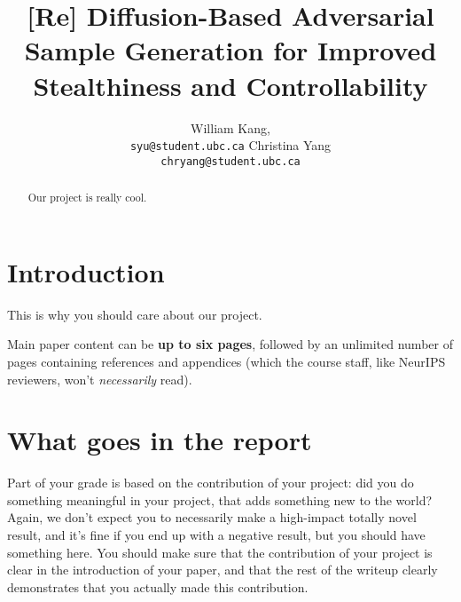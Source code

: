 \documentclass{article}
\title{[Re] Diffusion-Based Adversarial Sample Generation for Improved Stealthiness and Controllability}
\author{%
  William Kang,
  \\
  \texttt{syu@student.ubc.ca}
  \And
  Christina Yang\\
  \texttt{chryang@student.ubc.ca}
}
\begin{document}
\maketitle


\begin{abstract}
    Our project is really cool.
\end{abstract}


\section{Introduction}

This is why you should care about our project.

Main paper content can be \textbf{up to six pages},
followed by an unlimited number of pages containing references and appendices
(which the course staff, like NeurIPS reviewers, won't \emph{necessarily} read).

\section{What goes in the report}
Part of your grade is based on the contribution of your project:
did you do something meaningful in your project, that adds something new to the world?
Again, we don't expect you to necessarily make a high-impact totally novel result,
and it's fine if you end up with a negative result,
but you should have something here.
You should make sure that the contribution of your project is clear in the introduction of your paper,
and that the rest of the writeup clearly demonstrates that you actually made this contribution.
\end{document}
